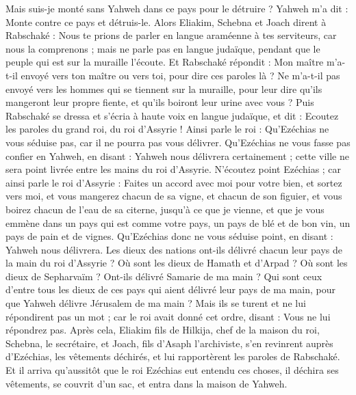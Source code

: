 \begin{multicols}{2}
Mais suis-je monté sans Yahweh dans ce pays pour le détruire ? Yahweh m'a dit : Monte contre ce pays et détruis-le.
Alors Eliakim, Schebna et Joach dirent à Rabschaké : Nous te prions de parler en langue araméenne à tes serviteurs, car nous la comprenons ; mais ne parle pas en langue judaïque, pendant que le peuple qui est sur la muraille l'écoute.
Et Rabschaké répondit : Mon maître m'a-t-il envoyé vers ton maître ou vers toi, pour dire ces paroles là ? Ne m'a-t-il pas envoyé vers les hommes qui se tiennent sur la muraille, pour leur dire qu'ils mangeront leur propre fiente, et qu'ils boiront leur urine avec vous ?
Puis Rabschaké se dressa et s'écria à haute voix en langue judaïque, et dit : Ecoutez les paroles du grand roi, du roi d'Assyrie !
Ainsi parle le roi : Qu'Ezéchias ne vous séduise pas, car il ne pourra pas vous délivrer.
Qu'Ezéchias ne vous fasse pas confier en Yahweh, en disant : Yahweh nous délivrera certainement ; cette ville ne sera point livrée entre les mains du roi d'Assyrie.
N'écoutez point Ezéchias ; car ainsi parle le roi d'Assyrie : Faites un accord avec moi pour votre bien, et sortez vers moi, et vous mangerez chacun de sa vigne, et chacun de son figuier, et vous boirez chacun de l'eau de sa citerne,
jusqu'à ce que je vienne, et que je vous emmène dans un pays qui est comme votre pays, un pays de blé et de bon vin, un pays de pain et de vignes.
Qu'Ezéchias donc ne vous séduise point, en disant : Yahweh nous délivrera. Les dieux des nations ont-ils délivré chacun leur pays de la main du roi d'Assyrie ?
Où sont les dieux de Hamath et d'Arpad ? Où sont les dieux de Sepharvaïm ? Ont-ils délivré Samarie de ma main ?
Qui sont ceux d'entre tous les dieux de ces pays qui aient délivré leur pays de ma main, pour que Yahweh délivre Jérusalem de ma main ?
Mais ils se turent et ne lui répondirent pas un mot ; car le roi avait donné cet ordre, disant : Vous ne lui répondrez pas.
Après cela, Eliakim fils de Hilkija, chef de la maison du roi, Schebna, le secrétaire, et Joach, fils d'Asaph l'archiviste, s'en revinrent auprès d'Ezéchias, les vêtements déchirés, et lui rapportèrent les paroles de Rabschaké.
\VerseOne{}Et il arriva qu'aussitôt que le roi Ezéchias eut entendu ces choses, il déchira ses vêtements, se couvrit d'un sac, et entra dans la maison de Yahweh.

\end{multicols}
